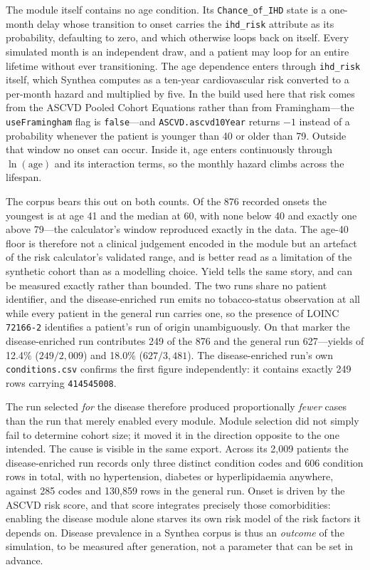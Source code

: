 The module itself contains no age condition. Its \texttt{Chance\_of\_IHD} state is a one-month
delay whose transition to onset carries the \texttt{ihd\_risk} attribute as its probability,
defaulting to zero, and which otherwise loops back on itself. Every simulated month is an
independent draw, and a patient may loop for an entire lifetime without ever transitioning.
The age dependence enters through \texttt{ihd\_risk} itself, which Synthea computes as a
ten-year cardiovascular risk converted to a per-month hazard and multiplied by five. In the
build used here that risk comes from the ASCVD Pooled Cohort Equations rather than from
Framingham---the \texttt{useFramingham} flag is \texttt{false}---and
\texttt{ASCVD.ascvd10Year} returns $-1$ instead of a probability whenever the patient is
younger than 40 or older than 79. Outside that window no onset can occur. Inside it, age
enters continuously through $\ln(\mathrm{age})$ and its interaction terms, so the monthly
hazard climbs across the lifespan.

The corpus bears this out on both counts. Of the 876 recorded onsets the youngest
is at age 41 and the median at 60, with none below 40 and exactly one
above 79---the calculator's window reproduced exactly in the data. The age-40 floor is
therefore not a clinical judgement encoded in the module but an artefact of the risk
calculator's validated range, and is better read as a limitation of the synthetic cohort than
as a modelling choice. Yield tells the same story, and can be measured exactly rather than
bounded. The two runs share no patient identifier, and the disease-enriched run emits no
tobacco-status observation at all while every patient in the general run carries one, so the
presence of LOINC \texttt{72166-2} identifies a patient's run of origin unambiguously. On that
marker the disease-enriched run contributes 249 of the 876 and the general run
627---yields of 12.4\% ($249/2{,}009$) and 18.0\%
($627/3{,}481$). The disease-enriched run's own \texttt{conditions.csv} confirms the first
figure independently: it contains exactly 249 rows carrying \texttt{414545008}.

The run selected \emph{for} the disease therefore produced proportionally \emph{fewer} cases
than the run that merely enabled every module. Module selection did not simply fail to
determine cohort size; it moved it in the direction opposite to the one intended. The cause is
visible in the same export. Across its 2{,}009 patients the disease-enriched run records only
three distinct condition codes and 606 condition rows in total, with
no hypertension, diabetes or hyperlipidaemia anywhere, against 285
codes and 130{,}859 rows in the general run. Onset is driven by the ASCVD risk
score, and that score integrates precisely those comorbidities: enabling the disease module
alone starves its own risk model of the risk factors it depends on. Disease prevalence in a
Synthea corpus is thus an \emph{outcome} of the simulation, to be measured after generation,
not a parameter that can be set in advance.

